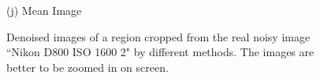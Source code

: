 \documentclass[10pt,onecolumn,letterpaper]{article}
\begin{document}
\begin{figure}
{\begin{minipage}[t]{0.195\textwidth}
{\footnotesize (j) Mean Image \cite{crosschannel2016}}
\end{minipage}
}
\caption{Denoised images of a region cropped from the real noisy image ``Nikon D800 ISO 1600 2" \cite{crosschannel2016} by different methods. The images are better to be zoomed in on screen.}
\label{fig5}
\end{figure}


\begin{figure}\vspace{3mm}
\centering
{}
\end{figure}
\end{document}

